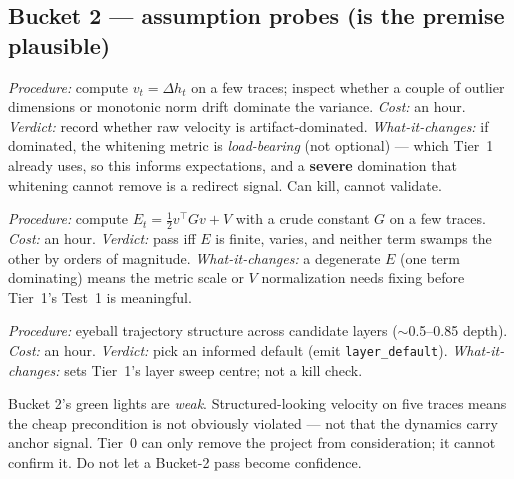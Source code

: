\documentclass[11pt]{article}
\newcommand{\out}[1]{\texttt{#1}}      %
\begin{document}
\subsection{Bucket 2 --- assumption probes (is the premise plausible)}
\label{sec:t0-probe}
\begin{description}[leftmargin=1.2em,style=nextline]
\item[\out{artifact\_verdict} --- velocity artifact domination]
\emph{Procedure:} compute $v_t=\Delta h_t$ on a few traces; inspect whether a
couple of outlier dimensions or monotonic norm drift dominate the variance.
\emph{Cost:} an hour. \emph{Verdict:} record whether raw velocity is
artifact-dominated. \emph{What-it-changes:} if dominated, the whitening metric is
\emph{load-bearing} (not optional) --- which Tier~1 already uses, so this informs
expectations, and a \textbf{severe} domination that whitening cannot remove is a
redirect signal. Can kill, cannot validate.
\item[energy computability]
\emph{Procedure:} compute $E_t=\tfrac12 v^\top G v + V$ with a crude constant $G$
on a few traces. \emph{Cost:} an hour. \emph{Verdict:} pass iff $E$ is finite,
varies, and neither term swamps the other by orders of magnitude.
\emph{What-it-changes:} a degenerate $E$ (one term dominating) means the metric
scale or $V$ normalization needs fixing before Tier~1's Test~1 is meaningful.
\item[\out{layer\_default} --- layer prior]
\emph{Procedure:} eyeball trajectory structure across candidate layers
($\sim$0.5--0.85 depth). \emph{Cost:} an hour. \emph{Verdict:} pick an informed
default (emit \out{layer\_default}). \emph{What-it-changes:} sets Tier~1's layer
sweep centre; not a kill check.
\end{description}

\begin{honest}
Bucket 2's green lights are \emph{weak}. Structured-looking velocity on five traces
means the cheap precondition is not obviously violated --- not that the dynamics
carry anchor signal. Tier~0 can only remove the project from consideration; it
cannot confirm it. Do not let a Bucket-2 pass become confidence.
\end{honest}
\end{document}
